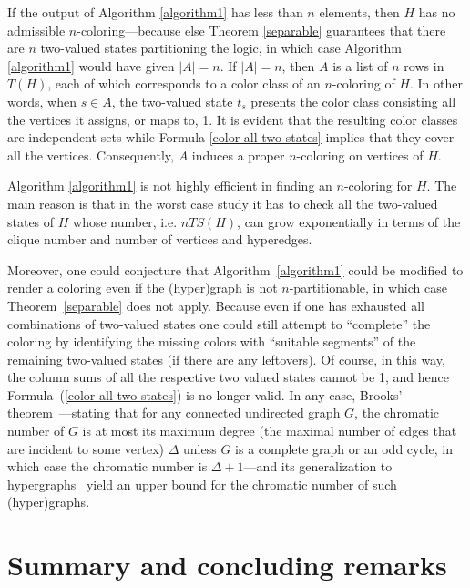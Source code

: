 \documentclass[%
12pt,
prereprint,
showpacs,
showkeys,
preprintnumbers,
amsmath,amssymb,
aps,
pra,
longbibliography,
notitlepage
]{revtex4-1}
\theoremstyle{definition}
\begin{document}
	If the output of Algorithm \ref{algorithm1} has less than $n$ elements, then $H$ has no admissible $n$-coloring---because else Theorem \ref{separable} guarantees that there are $n$ two-valued states partitioning the logic, in which case Algorithm \ref{algorithm1} would have given $\vert A \vert = n$. If $\vert A \vert =n$, then $A$ is a list of $n$ rows in $T(H)$, each of which corresponds to a color class of an $n$-coloring of $H$. In other words, when $s\in A$, the two-valued state $t_s$ presents the color class consisting all the vertices it assigns, or maps to, 1. It is evident that the resulting color classes are independent sets while Formula \ref{color-all-two-states} implies that they cover all the vertices. Consequently, $A$ induces a proper $n$-coloring on vertices of $H$.
	
	Algorithm \ref{algorithm1} is not highly efficient in finding an $n$-coloring for $H$. The main reason is that in the worst case study it has to check all the two-valued states of $H$ whose number, i.e. $nTS(H)$, can grow exponentially in terms of the clique number and number of vertices and hyperedges.
	
	Moreover, one could conjecture that Algorithm~\ref{algorithm1} could be modified to render a coloring even if the (hyper)graph is not $n$-partitionable, in which case Theorem~\ref{separable} does not apply.
	Because even if one has exhausted all combinations of two-valued states one could still attempt to ``complete'' the coloring by identifying the missing colors with
	``suitable segments'' of the remaining two-valued states (if there are any leftovers). Of course, in this way, the column sums of all the respective two valued states cannot be 1, and hence Formula~(\ref{color-all-two-states}) is no longer valid.
	In any case, Brooks' theorem~\cite{Brooks1941,Lovasz1975}---stating that for any connected undirected graph $G$, the chromatic number of $G$ is at most its maximum degree (the maximal number of edges that are incident to some vertex) $\Delta$  unless $G$ is a complete graph or an odd cycle, in which case the chromatic number is $\Delta + 1$---and its generalization to hypergraphs~\cite[page 45, Theorem 3.2]{Bretto-MR3077516} yield an upper bound for the chromatic number of such (hyper)graphs.
	
	
	\section{Summary and concluding remarks}
	
\end{document}
